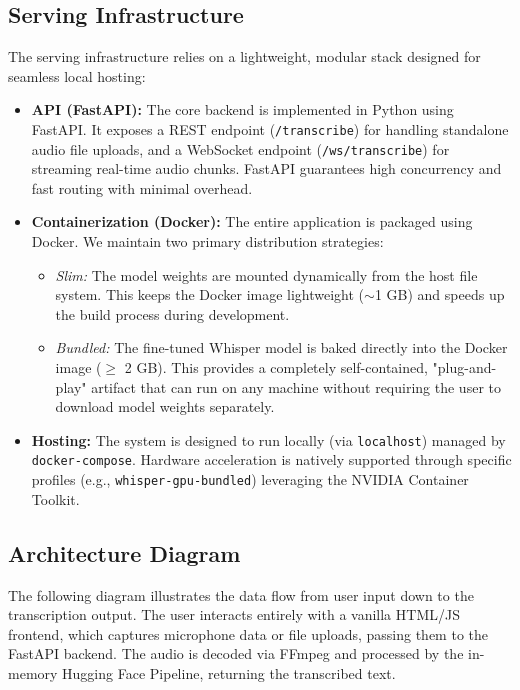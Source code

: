 \documentclass[12pt]{article}
\begin{document}
\subsection{Serving Infrastructure}
The serving infrastructure relies on a lightweight, modular stack designed for seamless local hosting:
\begin{itemize}
    \item \textbf{API (FastAPI):} The core backend is implemented in Python using FastAPI. It exposes a REST endpoint (\texttt{/transcribe}) for handling standalone audio file uploads, and a WebSocket endpoint (\texttt{/ws/transcribe}) for streaming real-time audio chunks. FastAPI guarantees high concurrency and fast routing with minimal overhead.
    \item \textbf{Containerization (Docker):} The entire application is packaged using Docker. We maintain two primary distribution strategies:
    \begin{itemize}
        \item \textit{Slim:} The model weights are mounted dynamically from the host file system. This keeps the Docker image lightweight ($\sim$1 GB) and speeds up the build process during development.
        \item \textit{Bundled:} The fine-tuned Whisper model is baked directly into the Docker image ($\ge$ 2 GB). This provides a completely self-contained, "plug-and-play" artifact that can run on any machine without requiring the user to download model weights separately.
    \end{itemize}
    \item \textbf{Hosting:} The system is designed to run locally (via \texttt{localhost}) managed by \texttt{docker-compose}. Hardware acceleration is natively supported through specific profiles (e.g., \texttt{whisper-gpu-bundled}) leveraging the NVIDIA Container Toolkit.
\end{itemize}

\subsection{Architecture Diagram}
The following diagram illustrates the data flow from user input down to the transcription output. The user interacts entirely with a vanilla HTML/JS frontend, which captures microphone data or file uploads, passing them to the FastAPI backend. The audio is decoded via FFmpeg and processed by the in-memory Hugging Face Pipeline, returning the transcribed text.
\end{document}
